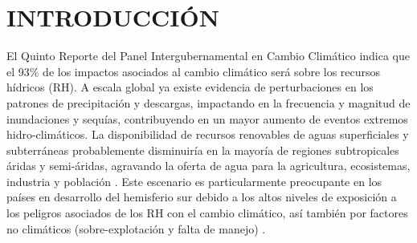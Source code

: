 \documentclass[12pt]{article}
\begin{document}
	

\clearpage

\tableofcontents
\clearpage
\listoffigures
\clearpage
\listoftables
\clearpage
\listofappendices
\clearpage



\clearpage
\vspace*{0.5mm}
\section{INTRODUCCIÓN}


El Quinto Reporte del Panel Intergubernamental en Cambio Climático \citep{Field2014} indica que el 93\% de los impactos asociados al cambio climático será sobre los recursos hídricos (RH). A escala global ya existe evidencia de perturbaciones en los patrones de precipitación y descargas, impactando en la frecuencia y magnitud de inundaciones y sequías, contribuyendo en un mayor aumento de eventos extremos hidro-climáticos. La disponibilidad de recursos renovables de aguas superficiales y subterráneas probablemente disminuiría en la mayoría de regiones subtropicales áridas y semi-áridas, agravando la oferta de agua para la agricultura, ecosistemas, industria y población \citep{Field2014}. Este escenario es particularmente preocupante en los países en desarrollo del hemisferio sur \citep{Satterthwaite2012} debido a los altos niveles de exposición a los peligros asociados de los RH con el cambio climático, así también por factores no climáticos (sobre-explotación y falta de manejo) \citep{MacAlister2018}.
\end{document}
